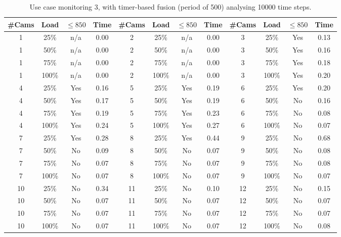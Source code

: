 \documentclass{article}
\begin{document}
\begin{table}
\centering
\begin{tabular}{|c|c|c|c|c|c|c|c|c|c|c|c|}
\hline
\#Cams & Load & $\leq 850$ & Time & \#Cams & Load & $\leq 850$ & Time & \#Cams & Load & $\leq 850$ & Time\\
\hline
1 & 25\% & n/a & 0.00 & 2 & 25\% & n/a & 0.00 & 3 & 25\% & Yes & 0.13\\
1 & 50\% & n/a & 0.00 & 2 & 50\% & n/a & 0.00 & 3 & 50\% & Yes & 0.16\\
1 & 75\% & n/a & 0.00 & 2 & 75\% & n/a & 0.00 & 3 & 75\% & Yes & 0.18\\
1 & 100\% & n/a & 0.00 & 2 & 100\% & n/a & 0.00 & 3 & 100\% & Yes & 0.20\\
\hline
4 & 25\% & Yes & 0.16 & 5 & 25\% & Yes & 0.19 & 6 & 25\% & Yes & 0.20\\
4 & 50\% & Yes & 0.17 & 5 & 50\% & Yes & 0.19 & 6 & 50\% & No & 0.16\\
4 & 75\% & Yes & 0.19 & 5 & 75\% & Yes & 0.23 & 6 & 75\% & No & 0.08\\
4 & 100\% & Yes & 0.24 & 5 & 100\% & Yes & 0.27 & 6 & 100\% & No & 0.07\\
\hline
7 & 25\% & Yes & 0.28 & 8 & 25\% & Yes & 0.44 & 9 & 25\% & No & 0.68\\
7 & 50\% & No & 0.09 & 8 & 50\% & No & 0.07 & 9 & 50\% & No & 0.08\\
7 & 75\% & No & 0.07 & 8 & 75\% & No & 0.07 & 9 & 75\% & No & 0.08\\
7 & 100\% & No & 0.07 & 8 & 100\% & No & 0.07 & 9 & 100\% & No & 0.07\\
\hline
10 & 25\% & No & 0.34 & 11 & 25\% & No & 0.10 & 12 & 25\% & No & 0.15\\
10 & 50\% & No & 0.07 & 11 & 50\% & No & 0.07 & 12 & 50\% & No & 0.07\\
10 & 75\% & No & 0.07 & 11 & 75\% & No & 0.07 & 12 & 75\% & No & 0.07\\
10 & 100\% & No & 0.07 & 11 & 100\% & No & 0.07 & 12 & 100\% & No & 0.08\\
\hline
\end{tabular}
\caption{Use case monitoring 3, with timer-based fusion (period of 500) analysing 10000 time steps.}
\end{table}
\end{document}
